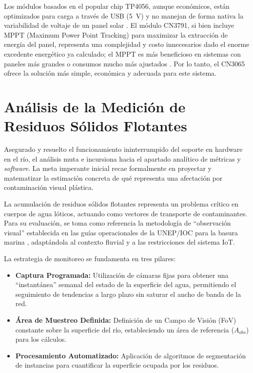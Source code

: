 Los módulos basados en el popular chip TP4056, aunque económicos, están optimizados para carga a través de USB (\SI{5}{\volt}) y no manejan de forma nativa la variabilidad de voltaje de un panel solar \cite{chipTP4056}. El módulo CN3791, si bien incluye MPPT (Maximum Power Point Tracking) para maximizar la extracción de energía del panel, representa una complejidad y costo innecesarios dado el enorme excedente energético ya calculado; el MPPT es más beneficioso en sistemas con paneles más grandes o consumos mucho más ajustados \cite{chipCN3791}. Por lo tanto, el CN3065 ofrece la solución más simple, económica y adecuada para este sistema.

\section{Análisis de la Medición de Residuos Sólidos Flotantes}
\label{sec:analisis_medicion_residuos}
Asegurado y resuelto el funcionamiento ininterrumpido del soporte en hardware en el río, el análisis muta e incursiona hacia el apartado analítico de métricas y \textit{software}. La meta imperante inicial recae formalmente en proyectar y matematizar la estimación concreta de qué representa una afectación por contaminación visual plástica.



La acumulación de residuos sólidos flotantes representa un problema crítico en cuerpos de agua lóticos, actuando como vectores de transporte de contaminantes. Para su evaluación, se toma como referencia la metodología de ``observación visual'' establecida en las guías operacionales de la UNEP/IOC para la basura marina \cite{cheshire2009directrices}, adaptándola al contexto fluvial y a las restricciones del sistema IoT.

La estrategia de monitoreo se fundamenta en tres pilares:
\begin{itemize}
    \item \textbf{Captura Programada:} Utilización de cámaras fijas para obtener una ``instantánea'' semanal del estado de la superficie del agua, permitiendo el seguimiento de tendencias a largo plazo sin saturar el ancho de banda de la red.
    \item \textbf{Área de Muestreo Definida:} Definición de un Campo de Visión (FoV) constante sobre la superficie del río, estableciendo un área de referencia ($A_{obs}$) para los cálculos.
    \item \textbf{Procesamiento Automatizado:} Aplicación de algoritmos de segmentación de instancias para cuantificar la superficie ocupada por los residuos.
\end{itemize}

